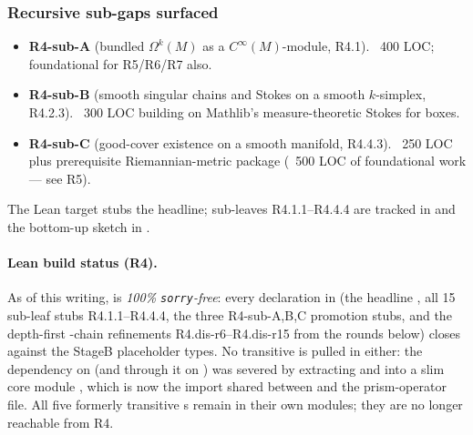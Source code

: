 \subsubsection*{Recursive sub-gaps surfaced}

\begin{itemize}
\item \textbf{R4-sub-A} (bundled \(\Omega^k(M)\) as a
  \(C^\infty(M)\)-module, R4.1).  ~400 LOC; foundational for
  R5/R6/R7 also.
\item \textbf{R4-sub-B} (smooth singular chains and Stokes on a
  smooth \(k\)-simplex, R4.2.3).  ~300 LOC building on Mathlib's
  measure-theoretic Stokes for boxes.
\item \textbf{R4-sub-C} (good-cover existence on a smooth manifold,
  R4.4.3).  ~250 LOC plus prerequisite Riemannian-metric package
  (~500 LOC of foundational work --- see R5).
\end{itemize}

\begin{lemma}
\label{lem:deRham-overview-stepwise}
The Lean target 
stubs the headline; sub-leaves R4.1.1--R4.4.4 are tracked in
 and the bottom-up sketch
in .
\leanok
\end{lemma}

\paragraph{Lean build status (R4).}
As of this writing,  is
\emph{100\% \texttt{sorry}-free}: every declaration in
 (the headline
, all 15 sub-leaf stubs R4.1.1--R4.4.4, the
three R4-sub-{A,B,C} promotion stubs, and the depth-first
-chain refinements R4.dis-r6--R4.dis-r15 from the rounds
below) closes against the StageB placeholder types.  No transitive
 is pulled in either: the dependency on
 (and through it on
) was severed by extracting
 and  into a slim core module
, which is now the
import shared between  and the
prism-operator file.  All five formerly transitive
s remain in their own modules; they are no longer
reachable from R4.


